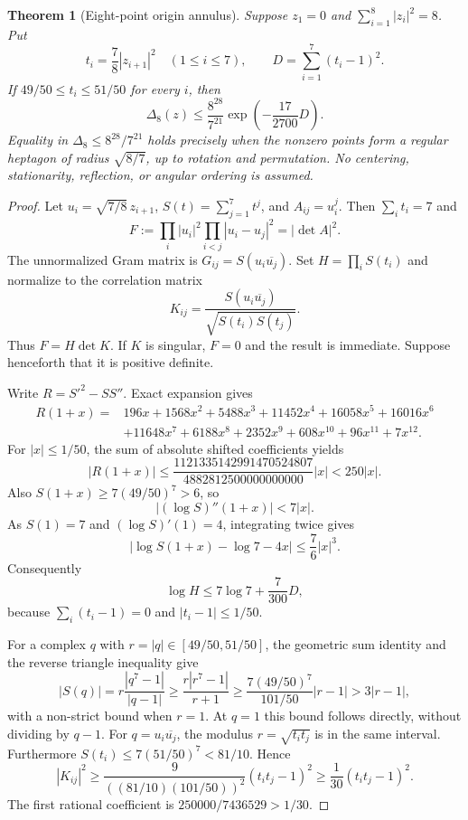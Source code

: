 \documentclass[11pt]{article}
\newtheorem{theorem}{Theorem}[section]
\theoremstyle{remark}
\numberwithin{equation}{section}
\begin{document}
\begin{theorem}[Eight-point origin annulus]
\label{thm:eight-origin-annulus}
Suppose $z_1=0$ and $\sum_{i=1}^8|z_i|^2=8$. Put
\[
 t_i=\frac78|z_{i+1}|^2\quad(1\le i\le7),\qquad
 D=\sum_{i=1}^7(t_i-1)^2.
\]
If $49/50\le t_i\le51/50$ for every $i$, then
\begin{equation}\label{eq:eight-origin-annulus}
 \boxed{\displaystyle
 \Delta_8(z)\le\frac{8^{28}}{7^{21}}
               \exp\!\left(-\frac{17}{2700}D\right).}
\end{equation}
Equality in $\Delta_8\le8^{28}/7^{21}$ holds precisely when the
nonzero points form a regular heptagon of radius $\sqrt{8/7}$,
up to rotation and permutation. No centering, stationarity,
reflection, or angular ordering is assumed.
\end{theorem}
\begin{proof}
Let $u_i=\sqrt{7/8}\,z_{i+1}$, $S(t)=\sum_{j=1}^7t^j$, and
$A_{ij}=u_i^j$. Then $\sum_i t_i=7$ and
\[
 F:=\prod_i|u_i|^2\prod_{i<j}|u_i-u_j|^2=|\det A|^2.
\]
The unnormalized Gram matrix is $G_{ij}=S(u_i\overline{u_j})$.
Set $H=\prod_iS(t_i)$ and normalize to the correlation matrix
\[
 K_{ij}=\frac{S(u_i\overline{u_j})}{\sqrt{S(t_i)S(t_j)}}.
\]
Thus $F=H\det K$. If $K$ is singular, $F=0$ and the result is
immediate. Suppose henceforth that it is positive definite.

Write $R=S'^2-SS''$. Exact expansion gives
\begin{align*}
 R(1+x)={}&196x+1568x^2+5488x^3+11452x^4+16058x^5
             +16016x^6\\
          &+11648x^7+6188x^8+2352x^9+608x^{10}
             +96x^{11}+7x^{12}.
\end{align*}
For $|x|\le1/50$, the sum of absolute shifted coefficients yields
\[
 |R(1+x)|\le
 \frac{1121335142991470524807}{4882812500000000000}|x|
 <250|x|.
\]
Also $S(1+x)\ge7(49/50)^7>6$, so
\[
 |(\log S)''(1+x)|<7|x|.
\]
As $S(1)=7$ and $(\log S)'(1)=4$, integrating twice gives
\[
 |\log S(1+x)-\log7-4x|\le\frac76|x|^3.
\]
Consequently
\begin{equation}\label{eq:eight-annulus-radial-excess}
 \log H\le7\log7+\frac7{300}D,
\end{equation}
because $\sum_i(t_i-1)=0$ and $|t_i-1|\le1/50$.

For a complex $q$ with $r=|q|\in[49/50,51/50]$, the geometric
sum identity and the reverse triangle inequality give
\[
 |S(q)|=r\frac{|q^7-1|}{|q-1|}
 \ge\frac{r|r^7-1|}{r+1}
 \ge\frac{7(49/50)^7}{101/50}|r-1|
 >3|r-1|,
\]
with a non-strict bound when $r=1$. At $q=1$ this bound follows
directly, without dividing by $q-1$. For $q=u_i\overline{u_j}$,
the modulus $r=\sqrt{t_it_j}$ is in the same interval. Furthermore
$S(t_i)\le7(51/50)^7<81/10$. Hence
\begin{equation}\label{eq:eight-annulus-pair-deficit}
 |K_{ij}|^2\ge
 \frac9{((81/10)(101/50))^2}(t_it_j-1)^2
 \ge\frac1{30}(t_it_j-1)^2.
\end{equation}
The first rational coefficient is $250000/7436529>1/30$.


\end{proof}
\end{document}
